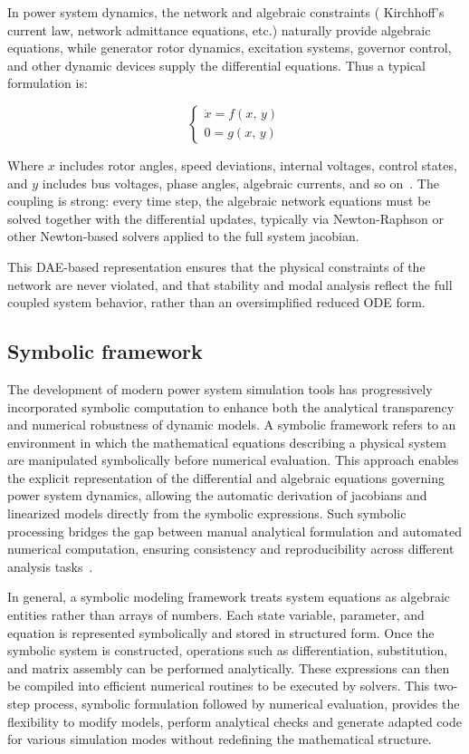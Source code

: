  
In power system dynamics, the network and algebraic constraints ( Kirchhoff's current law, network admittance equations, etc.) naturally provide algebraic equations, 
while generator rotor dynamics, excitation systems, governor control, and other dynamic devices supply the differential equations. Thus a typical formulation is:

\begin{equation}
\begin{cases}
\dot{x} = f(x,\, y) \\
0 = g(x,\, y)
\end{cases}
\end{equation}

Where $x$ includes rotor angles, speed deviations, internal voltages, control states, and $y$ includes bus voltages, phase angles, algebraic currents, and so on~\cite{SauerPaiBook}. 
The coupling is strong: every time step, the algebraic network equations must be solved together with the differential updates, typically via Newton-Raphson or other Newton-based 
solvers applied to the full system jacobian.   

This DAE-based representation ensures that the physical constraints of the network are never violated, and that stability and modal analysis reflect the full coupled system behavior,
rather than an oversimplified reduced ODE form.  

\subsection{Symbolic framework}

The development of modern power system simulation tools has progressively incorporated symbolic computation to enhance both the analytical transparency and numerical
robustness of dynamic models. A symbolic framework refers to an environment in which the mathematical equations describing a physical system are manipulated symbolically
before numerical evaluation. This approach enables the explicit representation of the differential and algebraic equations governing power system dynamics, allowing the 
automatic derivation of jacobians and linearized models directly from the symbolic expressions.
Such symbolic processing bridges the gap between manual analytical formulation and automated numerical computation, ensuring consistency and reproducibility across 
different analysis tasks~\cite{SymbolicHantao}.

In general, a symbolic modeling framework treats system equations as algebraic entities rather than arrays of numbers. Each state variable, parameter, and equation
is represented symbolically and stored in structured form. Once the symbolic system is constructed, operations such as differentiation, substitution, and matrix assembly
can be performed analytically. These expressions can then be compiled into efficient numerical routines to be executed by solvers. 
This two-step process, symbolic formulation followed by numerical evaluation, provides the flexibility to modify models, perform analytical checks
and generate adapted code for various simulation modes without redefining the mathematical structure.

